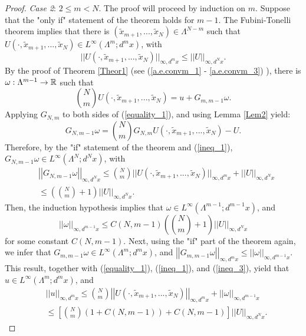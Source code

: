 \documentclass[12pt,leqno]{amsart}
\numberwithin{equation}{section}
\numberwithin{theor}{section}
\numberwithin{rem}{section}
\begin{document}
\begin{proof}
\textit{Case 2}: $2\leq m<N$.  The proof will proceed by  
induction on $m$.  Suppose that the "only if" statement of the theorem holds for $m-1$.  
The Fubini-Tonelli theorem implies that there is $(\tilde{x}_{m+1},...,\tilde{x}_{N})\in\Lambda^{N-m}$ such that 
$U(\cdot,\tilde{x}_{m+1},...,\tilde{x}_{N})\in 
L^{\infty}(\Lambda^m; d^{m}x)$, with 
\begin{equation}
\label{ineq_1}
|| U(\cdot,\tilde{x}_{m+1},...,\tilde{x}_{N}) ||_{\infty,d^{m}x}\leq || U ||_{\infty,d^{N}x}. 
\end{equation} 
By the proof of Theorem \ref{Theor1} (see (\ref{a.e.convm_1} - \ref{a.e.convm_3}) ), there is $\omega:\Lambda^{m-1}\rightarrow \Bbb{R}$ such that 
\begin{equation}
\label{equality_1}
\binom{N}{m} U(\cdot,\tilde{x}_{m+1},...,\tilde{x}_{N})=
u + G_{m,m-1} \omega .  
\end{equation}
Applying $G_{N,m}$ to both sides of (\ref{equality_1}), and 
using Lemma \ref{Lem2} yield:
\begin{equation}
G_{N,m-1}\omega = \binom{N}{m} 
G_{N,m} U(\cdot,\tilde{x}_{m+1},...,\tilde{x}_{N})-U.
\end{equation}
Therefore, by the "if" statement of the theorem and 
(\ref{ineq_1}), $G_{N,m-1}\omega\in 
L^{\infty}(\Lambda^N; d^{N}x)$, with 
\begin{equation}
\label{ineq_2}
\begin{split}
&\left | \left |G_{N,m-1}\omega\right | \right |_{\infty,d^{N}x}
\leq \binom{N}{m} || U(\cdot,\tilde{x}_{m+1},...,\tilde{x}_{N}) 
||_{\infty,d^{m}x} + || U ||_{\infty,d^{N}x} \\
&\leq 
\left ( \binom{N}{m} +1 \right ) || U ||_{\infty,d^{N}x}.
\end{split}
\end{equation}
Then, the induction hypothesis implies that 
$\omega\in 
L^{\infty}(\Lambda^{m-1}; d^{m-1}x)$, and  
\begin{equation}
\label{ineq_3}
||\omega ||_{\infty,d^{m-1}x}\leq C(N,m-1)
\left ( \binom{N}{m} +1 \right ) || U ||_{\infty,d^{N}x}
\end{equation}
for some constant $C(N,m-1)$.  Next, using the "if" part of 
the theorem again, we infer that $G_{m,m-1}\omega\in
L^{\infty}(\Lambda^m;d^{m}x)$, and $\left | \left | 
G_{m,m-1}\omega \right | \right |_{\infty,d^{m}x}\leq 
||\omega ||_{\infty,d^{m-1}x}$.  This result, together 
with (\ref{equality_1}), (\ref{ineq_1}), and (\ref{ineq_3}),  
yield that $u\in L^{\infty}(\Lambda^m;d^{m}x)$, and
\begin{equation}
\begin{split}
&|| u ||_{\infty,d^{m}x}\leq \binom{N}{m} 
\left | \left | U(\cdot,\tilde{x}_{m+1},...,\tilde{x}_{N}) 
\right |\right |_{\infty,d^{m}x} + 
||\omega ||_{\infty,d^{m-1}x}\\
& \leq \left [ \binom{N}{m} \left ( 1 + C(N,m-1)\right ) + 
C(N,m-1) \right ] 
\left | \left | U 
\right |\right |_{\infty,d^{N}x}.
\end{split}
\end{equation}
\end{proof}
\end{document}
